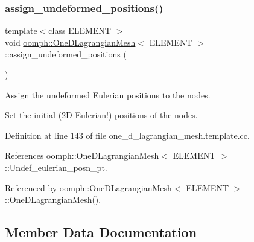 \mbox{\label{classoomph_1_1OneDLagrangianMesh_a1eebb0eddd75a7c2847615c05b5fb4d8}} 
\subsubsection{\texorpdfstring{assign\+\_\+undeformed\+\_\+positions()}{assign\_undeformed\_positions()}}
{\footnotesize\ttfamily template$<$class E\+L\+E\+M\+E\+NT $>$ \\
void \hyperlink{classoomph_1_1OneDLagrangianMesh}{oomph\+::\+One\+D\+Lagrangian\+Mesh}$<$ E\+L\+E\+M\+E\+NT $>$\+::assign\+\_\+undeformed\+\_\+positions (\begin{DoxyParamCaption}{ }\end{DoxyParamCaption})\hspace{0.3cm}{\ttfamily [private]}}



Assign the undeformed Eulerian positions to the nodes. 

Set the initial (2D Eulerian!) positions of the nodes. 

Definition at line 143 of file one\+\_\+d\+\_\+lagrangian\+\_\+mesh.\+template.\+cc.



References oomph\+::\+One\+D\+Lagrangian\+Mesh$<$ E\+L\+E\+M\+E\+N\+T $>$\+::\+Undef\+\_\+eulerian\+\_\+posn\+\_\+pt.



Referenced by oomph\+::\+One\+D\+Lagrangian\+Mesh$<$ E\+L\+E\+M\+E\+N\+T $>$\+::\+One\+D\+Lagrangian\+Mesh().



\subsection{Member Data Documentation}
\mbox{\label{classoomph_1_1OneDLagrangianMesh_af9b27f687d7ec160a01d6ed8c07570ed}} 

